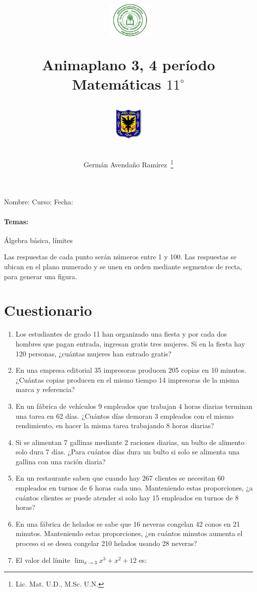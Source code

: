 \documentclass[letterpaper,10pt,twoside]{article}
\author{Germ\'an Avenda\~no Ram\'irez~\thanks{Lic. Mat. U.D., M.Sc. U.N.}}
\title{\begin{minipage}{.2\textwidth}
\includegraphics[height=1.75cm]{Images/logo-colegio.png}\end{minipage}
\begin{minipage}{.55\textwidth}
\begin{center}
Animaplano 3, 4 período\\
Matemáticas $11^{\circ}$
\end{center}
\end{minipage}\hfill
\begin{minipage}{.2\textwidth}
\includegraphics[height=1.75cm]{Images/logo-sed.png} 
\end{minipage}}
\date{}
\begin{document}
\maketitle
Nombre: \hrulefill Curso: \underline{\hspace*{44pt}} Fecha: \underline{\hspace*{2.5cm}}
\paragraph*{Temas:} Álgebra básica, límites 
\begin{multicols}{2}
	Las respuestas de cada punto serán números entre 1 y 100. Las respuestas se ubican en el plano numerado y se unen en orden mediante segmentos de recta, para generar una figura.
\section*{Cuestionario}
\begin{enumerate}
\item Los estudiantes de grado 11 han organizado una fiesta y por cada dos hombres que pagan entrada, ingresan gratis tres mujeres. Si en la fiesta hay 120 personas, ¿cuántas mujeres han entrado gratis?
\item En una empresa editorial 35 impresoras producen 205 copias en 10 minutos. ¿Cuántas copias producen en el mismo tiempo 14 impresoras de la misma marca y referencia?
\item En un fábrica de vehículos 9 empleados que trabajan 4 horas diarias terminan una tarea en 62 días. ¿Cuántos días demoran 3 empleados con el mismo rendimiento, en hacer la misma tarea trabajando 8 horas diarias?
\item Si se alimentan 7 gallinas mediante 2 raciones diarias, un bulto de alimento solo dura 7 días. ¿Para cuántos días dura un bulto si solo se alimenta una gallina con una ración diaria?
\item En un restaurante saben que cuando hay 267 clientes se necesitan 60 empleados en turnos de 6 horas cada uno. Manteniendo estas proporciones, ¿a cuántos clientes se puede atender si solo hay 15 empleados en turnos de 8 horas?
\item En una fábrica de helados se sabe que 16 neveras congelan 42 conos en 21 minutos. Manteniendo estas proporciones, ¿en cuántos minutos aumenta el proceso si se desea congelar 210 helados usando 28 neveras?
\item El valor del límite $\displaystyle{\lim_{x\rightarrow 3}x^{3}+x^{2}+12}$ es:

\end{enumerate}
\end{multicols}
\end{document}
